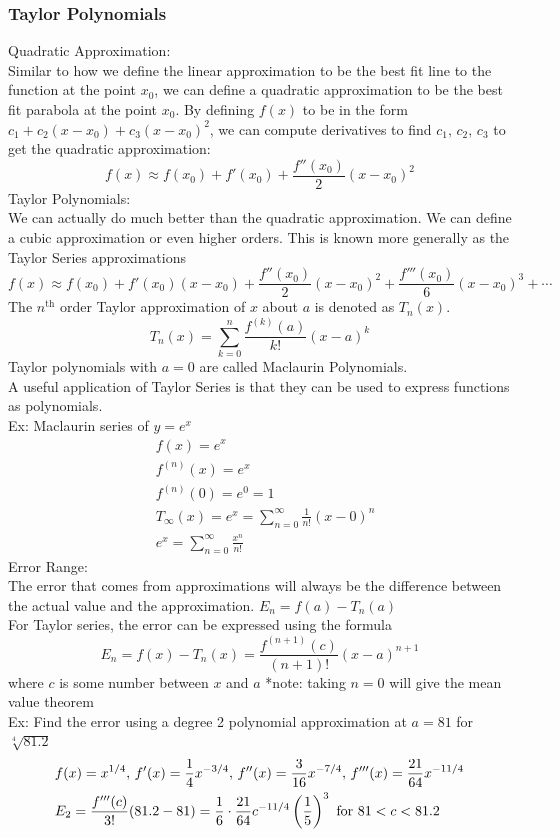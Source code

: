 \documentclass[11pt, fleqn]{article}
\begin{document}
\subsubsection{Taylor Polynomials}
Quadratic Approximation:\\
Similar to how we define the linear approximation to be the best fit line to the function at the point $x_0$, we can define a quadratic approximation to be the best fit parabola at the point $x_0$. By defining $f(x)$ to be in the form $c_1+c_2(x-x_0)+c_3(x-x_0)^2$, we can compute derivatives to find $c_1,\,c_2,\,c_3$ to get the quadratic approximation:
$$f(x)\approx f(x_0)+f'(x_0)+\frac{f''(x_0)}{2}(x-x_0)^2$$
Taylor Polynomials:\\
We can actually do much better than the quadratic approximation. We can define a cubic approximation or even higher orders. This is known more generally as the Taylor Series approximations
$$f(x)\approx f(x_0)+f'(x_0)(x-x_0)+\frac{f''(x_0)}{2}(x-x_0)^2+\frac{f'''(x_0)}{6}(x-x_0)^3+\cdots$$
The $n^\text{th}$ order Taylor approximation of $x$ about $a$ is denoted as $T_n(x)$.
$$T_n(x)=\sum_{k=0}^n\frac{f^{(k)}(a)}{k!}(x-a)^k$$
Taylor polynomials with $a=0$ are called Maclaurin Polynomials.\\
A useful application of Taylor Series is that they can be used to express functions as polynomials.\\
Ex: Maclaurin series of $y=e^x$
\begin{align*}
    &f(x)=e^x\\
    &f^{(n)}(x)=e^x\\
    &f^{(n)}(0)=e^0=1\\
    &T_\infty(x)=e^x=\sum_{n=0}^\infty\frac{1}{n!}(x-0)^n\\
    &e^x=\sum_{n=0}^\infty\frac{x^n}{n!}
\end{align*}
Error Range:\\
The error that comes from approximations will always be the difference between the actual value and the approximation. $E_n=f(a)-T_n(a)$\\
For Taylor series, the error can be expressed using the formula
$$E_n=f(x)-T_n(x)=\frac{f^{(n+1)}(c)}{(n+1)!}(x-a)^{n+1}$$
where $c$ is some number between $x$ and $a$
*note: taking $n=0$ will give the mean value theorem\\
Ex: Find the error using a degree 2 polynomial approximation at $a=81$ for $\sqrt[4]{81.2}$
\begin{align*}
    &f(x)=x^{1/4},\,f'(x)=\frac{1}{4}x^{-3/4},\,f''(x)=\frac{3}{16}x^{-7/4},\,f'''(x)=\frac{21}{64}x^{-11/4}\\
    &E_2=\frac{f'''(c)}{3!}(81.2-81)=\frac{1}{6}\cdot\frac{21}{64}c^{-11/4}\left( \frac{1}{5} \right)^3\text{ for $81<c<81.2$}
\end{align*}
\end{document}
